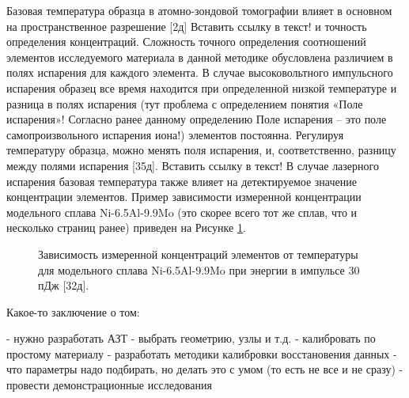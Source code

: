 Базовая температура образца в атомно-зондовой томографии влияет в основном на пространственное разрешение [2д] Вставить ссылку в текст! и точность определения концентраций. Сложность точного определения соотношений элементов исследуемого материала в данной методике обусловлена различием в полях испарения для каждого элемента. В случае высоковольтного импульсного испарения образец все время находится при определенной низкой температуре и разница в полях испарения (тут проблема с определением понятия «Поле испарения»! Согласно ранее данному определению Поле испарения – это поле самопроизвольного испарения иона!) элементов постоянна. Регулируя температуру образца, можно менять поля испарения, и, соответственно, разницу между полями испарения [35д]. Вставить ссылку в текст!
В случае лазерного испарения базовая температура также влияет на детектируемое значение концентрации элементов. Пример зависимости измеренной концентрации модельного сплава Ni-6.5Al-9.9Mo (это скорее всего тот же сплав, что и несколько страниц ранее) приведен на Рисунке \cref{fig:ParamsTemperatureComposition}.

\begin{figure}[htb]
	\caption{Зависимость измеренной концентраций элементов от температуры для модельного сплава Ni-6.5Al-9.9Mo при энергии в импульсе 30 пДж [32д]. }
	\label{fig:ParamsTemperatureComposition}
\end{figure}



\FloatBarrier

Какое-то заключение о том:

- нужно разработать АЗТ
- выбрать геометрию, узлы и т.д.
- калибровать по простому материалу
- разработать методики калибровки восстановения данных
- что параметры надо подбирать, но делать это с умом (то есть не все и не сразу)
- провести демонстрационные исследования



























